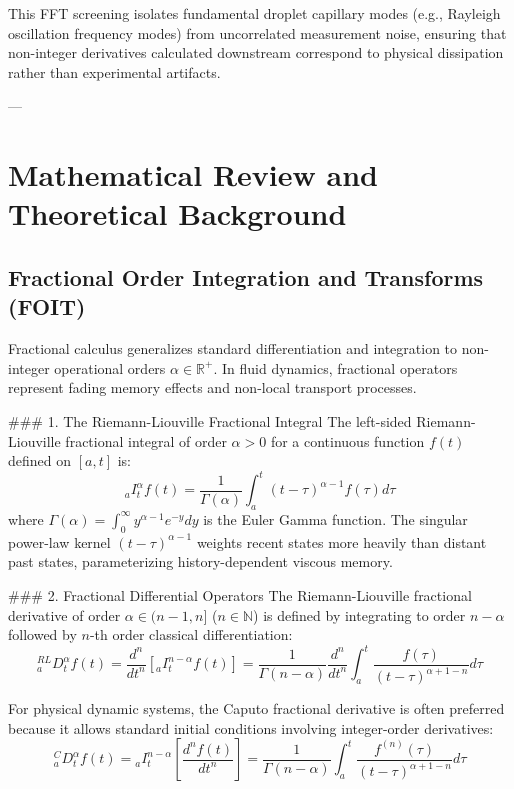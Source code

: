 \documentclass[11pt,a4paper]{article}
\begin{document}
This FFT screening isolates fundamental droplet capillary modes (e.g., Rayleigh oscillation frequency modes) from uncorrelated measurement noise, ensuring that non-integer derivatives calculated downstream correspond to physical dissipation rather than experimental artifacts.

---

\section{Mathematical Review and Theoretical Background} \label{sec:math_review}

\subsection{Fractional Order Integration and Transforms (FOIT)}

Fractional calculus generalizes standard differentiation and integration to non-integer operational orders $\alpha \in \mathbb{R}^+$. In fluid dynamics, fractional operators represent fading memory effects and non-local transport processes.

### 1. The Riemann-Liouville Fractional Integral
The left-sided Riemann-Liouville fractional integral of order $\alpha > 0$ for a continuous function $f(t)$ defined on $[a, t]$ is:
\begin{equation}
_{a}I_{t}^{\alpha} f(t) = \frac{1}{\Gamma(\alpha)} \int_{a}^{t} (t - \tau)^{\alpha - 1} f(\tau) d\tau
\end{equation}
where $\Gamma(\alpha) = \int_{0}^{\infty} y^{\alpha-1} e^{-y} dy$ is the Euler Gamma function. The singular power-law kernel $(t - \tau)^{\alpha - 1}$ weights recent states more heavily than distant past states, parameterizing history-dependent viscous memory.

### 2. Fractional Differential Operators
The Riemann-Liouville fractional derivative of order $\alpha \in (n-1, n]$ ($n \in \mathbb{N}$) is defined by integrating to order $n - \alpha$ followed by $n$-th order classical differentiation:
\begin{equation}
_{a}^{RL}D_{t}^{\alpha} f(t) = \frac{d^n}{dt^n} \left[ _{a}I_{t}^{n-\alpha} f(t) \right] = \frac{1}{\Gamma(n - \alpha)} \frac{d^n}{dt^n} \int_{a}^{t} \frac{f(\tau)}{(t - \tau)^{\alpha + 1 - n}} d\tau
\end{equation}

For physical dynamic systems, the Caputo fractional derivative is often preferred because it allows standard initial conditions involving integer-order derivatives:
\begin{equation}
_{a}^{C}D_{t}^{\alpha} f(t) = {}_{a}I_{t}^{n-\alpha} \left[ \frac{d^n f(t)}{dt^n} \right] = \frac{1}{\Gamma(n - \alpha)} \int_{a}^{t} \frac{f^{(n)}(\tau)}{(t - \tau)^{\alpha + 1 - n}} d\tau
\end{equation}
\end{document}
